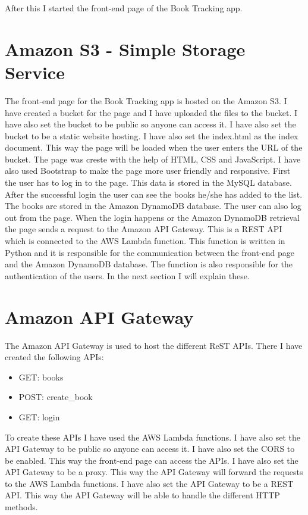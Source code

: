 \documentclass[11pt,a4paper,oneside]{report}
\begin{document}
After this I started the front-end page of the Book Tracking app.

\section{Amazon S3 - Simple Storage Service}

The front-end page for the Book Tracking app is hosted on the Amazon S3. I have created a bucket for the page and I have uploaded the files to the bucket. I have also set the bucket to be public so anyone can access it. I have also set the bucket to be a static website hosting. I have also set the index.html as the index document. This way the page will be loaded when the user enters the URL of the bucket.
The page was creste with the help of HTML, CSS and JavaScript. I have also used Bootstrap to make the page more user friendly and responsive. First the user has to log in to the page.
This data is stored in the MySQL database. After the successful login the user can see the books he/she has added to the list.
The books are stored in the Amazon DynamoDB database. The user can also log out from the page.
When the login happens or the Amazon DynamoDB retrieval the page sends a request to the Amazon API Gateway. This is a REST API which is connected to the AWS Lambda function. This function is written in Python and it is responsible for the communication between the front-end page and the Amazon DynamoDB database. The function is also responsible for the authentication of the users.
In the next section I will explain these.

\section{Amazon API Gateway}

The Amazon API Gateway is used to host the different ReST APIs. There I have created the following APIs:
\begin{itemize}
  \item GET: books
  \item POST: create\_book
  \item GET: login
\end{itemize}

To create these APIs I have used the AWS Lambda functions. I have also set the API Gateway to be public so anyone can access it. I have also set the CORS to be enabled. This way the front-end page can access the APIs. I have also set the API Gateway to be a proxy. This way the API Gateway will forward the requests to the AWS Lambda functions. I have also set the API Gateway to be a REST API. This way the API Gateway will be able to handle the different HTTP methods.
\end{document}
